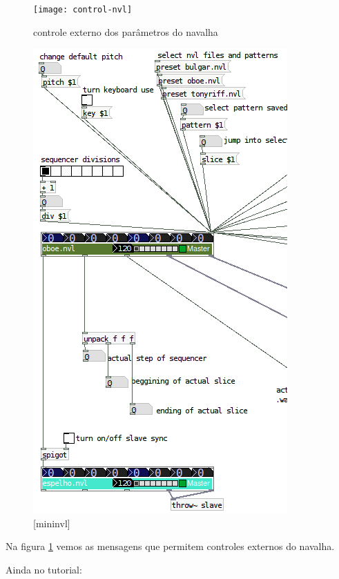 \documentclass{ppgmus}
\begin{document}
\begin{figure}[-h]
\texttt{[image: control-nvl]}
\caption{controle externo dos parâmetros do navalha}
\label{control-nvl}
\end{figure}

\begin{figure}[-h]
\includegraphics[scale=.6]{mininvl}
\caption{[mininvl]}
\label{mininvl}
\end{figure}

Na figura \ref{control-nvl} vemos as mensagens que permitem controles externos do navalha.

Ainda no tutorial:
\end{document}
